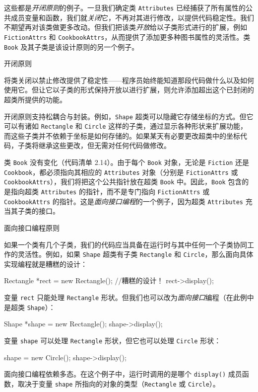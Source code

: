 这些都是\emph{开闭}\emph{原则}的例子。一旦我们确定类 \texttt{Attributes} 已经捕获了所有属性的公共成员变量和函数，我们就\emph{关闭}它，不再对其进行修改，以提供代码稳定性。我们不期望再对该类做更多改动。但我们把该类\emph{开放}给以子类形式进行的扩展，例如 \texttt{Fiction\allowbreak{}Attrs} 和 \texttt{Cookbook\allowbreak{}Attrs}，从而提供了添加更多种图书属性的灵活性。类 \texttt{Book} 及其子类是该设计原则的另一个例子。

\begin{mySidebar}{开闭原则}

将类关闭以禁止修改提供了稳定性——程序员始终能知道那段代码做什么以及如何使用它。但让它以子类的形式保持开放以进行扩展，则允许添加超出这个已封闭的超类所提供的功能。

开闭原则支持松耦合与封装。例如，\texttt{Shape} 超类可以隐藏它存储坐标的方式。但它可以有诸如 \texttt{Rectangle} 和 \texttt{Circle} 这样的子类，通过显示各种形状来扩展功能，而这些子类并不依赖于坐标是如何存储的。如果某天有必要更改超类中的坐标代码，子类将继承这些更改，但无需对任何代码做修改。
\end{mySidebar}

类 \texttt{Book} 没有变化（代码清单 2.14）。由于每个 \texttt{Book} 对象，无论是 \texttt{Fiction} 还是 \texttt{Cookbook}，都必须指向其相应的 \texttt{Attributes} 对象（分别是 \texttt{Fiction\allowbreak{}Attrs} 或 \texttt{Cookbook\allowbreak{}Attrs}），我们将把这个公共指针放在超类 \texttt{Book} 中。因此，\texttt{Book} 包含的是指向超类 \texttt{Attributes} 的指针，而不是专门指向 \texttt{Fiction\allowbreak{}Attrs} 或 \texttt{Cookbook\allowbreak{}Attrs} 的指针。这是\emph{面向接口编程}的一个例子，因为超类 \texttt{Attributes} 充当其子类的接口。

\begin{mySidebar}{面向接口编程原则}

如果一个类有几个子类，我们的代码应当具备在运行时与其中任何一个子类协同工作的灵活性。例如，如果 \texttt{Shape} 超类有子类 \texttt{Rectangle} 和 \texttt{Circle}，那么面向具体实现编程就是糟糕的设计：

\begin{codebox}
    Rectangle *rect = new Rectangle();  //糟糕的设计！
    rect->display();
\end{codebox}

变量 \texttt{rect} 只能处理 \texttt{Rectangle} 形状。但我们也可以改为\emph{面向接口}编程（在此例中是超类 \texttt{Shape}）：

\begin{codebox}
    Shape *shape = new Rectangle();
    shape->display();
\end{codebox}

变量 \texttt{shape} 可以处理 \texttt{Rectangle} 形状，但它也可以处理 \texttt{Circle} 形状：

\begin{codebox}
    shape = new Circle();
    shape->display();
\end{codebox}

面向接口编程依赖多态。在这个例子中，运行时调用的是哪个 \texttt{display()} 成员函数，取决于变量 \texttt{shape} 所指向的对象的类型（\texttt{Rectangle} 或 \texttt{Circle}）。
\end{mySidebar}

